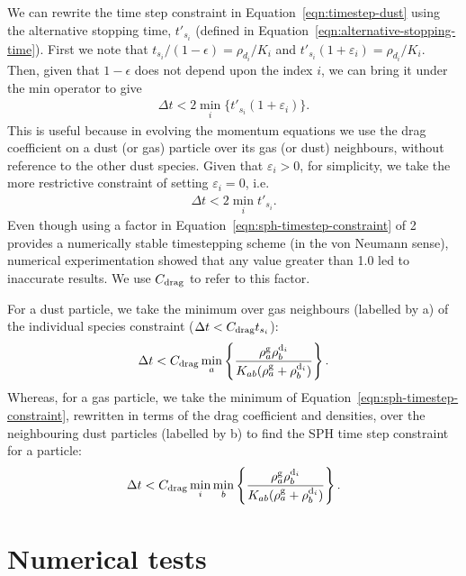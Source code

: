 \documentclass[fleqn,usenatbib]{mnras}
\newcommand{\g}{\mathrm{g}}
\newcommand{\dd}{\mathrm{d}}
\begin{document}
We can rewrite the time step constraint in Equation~\ref{eqn:timestep-dust}
using the alternative stopping time, \(t'_{s_i}\) (defined in
Equation~\ref{eqn:alternative-stopping-time}). First we note that \(t_{s_i} / (1
- \epsilon) = \rho_{d_i} / K_i\) and \(t'_{s_i} (1 + \varepsilon_i) = \rho_{d_i}
/ K_i\). Then, given that \(1 - \epsilon\) does not depend upon the index \(i\),
we can bring it under the min operator to give
%
\begin{align}
   \Delta t < 2 \min_i \{t'_{s_i} (1 + \varepsilon_i)\}.
\end{align}
%
This is useful because in evolving the momentum equations we use the drag
coefficient on a dust (or gas) particle over its gas (or dust) neighbours,
without reference to the other dust species. Given that \(\varepsilon_i > 0\),
for simplicity, we take the more restrictive constraint of setting
\(\varepsilon_i = 0\), i.e.
%
\begin{align}
   \label{eqn:sph-timestep-constraint}
   \Delta t < 2 \min_i t'_{s_i}.
\end{align}
%
Even though using a factor in Equation~\ref{eqn:sph-timestep-constraint} of 2
provides a numerically stable timestepping scheme (in the von Neumann sense),
numerical experimentation showed that any value greater than 1.0 led to
inaccurate results. We use \(C_{\rm drag}\) to refer to this factor.

For a dust particle, we take the minimum over gas neighbours (labelled by a) of
the individual species constraint (\(\Delta t < C_{\rm drag} t_{s_i}\)):
%
\begin{align}
   \Delta t < C_{\rm drag} \min_{a}
   \left\{ \frac{\rho^{\g}_a \rho^{\dd_i}_b}{K_{ab} (\rho^{\g}_a + \rho^{\dd_i}_b)} \right\}.
\end{align}
%
Whereas, for a gas particle, we take the minimum of
Equation~\ref{eqn:sph-timestep-constraint}, rewritten in terms of the drag
coefficient and densities, over the neighbouring dust particles (labelled by b)
to find the SPH time step constraint for a particle:
%
\begin{align}
   \Delta t < C_{\rm drag} \min_i \min_{b}
   \left\{ \frac{\rho^{\g}_a \rho^{\dd_i}_b}{K_{ab} (\rho^{\g}_a + \rho^{\dd_i}_b)} \right\}.
\end{align}


\section{Numerical tests}%
\label{sec:tests}
\end{document}
